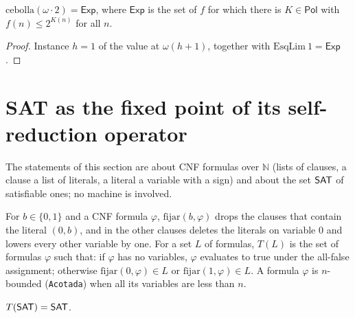 \begin{theorem}
  \label{thm:scales-cebolla-exp}
  \leanok
  $\mathrm{cebolla}(\omega\cdot 2) = \mathsf{Exp}$, where $\mathsf{Exp}$ is the set of $f$ for which there
  is $K \in \mathsf{Pol}$ with $f(n) \le 2^{K(n)}$ for all $n$.
  \own{}
\end{theorem}

\begin{proof}
  \leanok
  Instance $h = 1$ of the value at $\omega(h+1)$, together with $\mathrm{EsqLim}\ 1 = \mathsf{Exp}$.
\end{proof}

\section{SAT as the fixed point of its self-reduction operator}
\label{sec:scales-punto-fijo}

The statements of this section are about CNF formulas over $\mathbb{N}$ (lists of clauses, a clause a list
of literals, a literal a variable with a sign) and about the set $\mathsf{SAT}$ of satisfiable ones; no machine is
involved.

\begin{definition}
  \label{def:scales-T}
  \leanok
  For $b \in \{0,1\}$ and a CNF formula $\varphi$, $\mathrm{fijar}(b,\varphi)$ drops the clauses that
  contain the literal $(0,b)$, and in the other clauses deletes the literals on variable $0$ and lowers
  every other variable by one. For a set $L$ of formulas, $T(L)$ is the set of formulas $\varphi$ such
  that: if $\varphi$ has no variables, $\varphi$ evaluates to true under the all-false assignment;
  otherwise $\mathrm{fijar}(0,\varphi) \in L$ or $\mathrm{fijar}(1,\varphi) \in L$. A formula
  $\varphi$ is $n$-bounded (\texttt{Acotada}) when all its variables are less than $n$.
  \own{}
\end{definition}

\begin{theorem}
  \label{thm:scales-sat-punto-fijo}
  \leanok
  $T(\mathsf{SAT}) = \mathsf{SAT}$.
  \own{}
\end{theorem}

